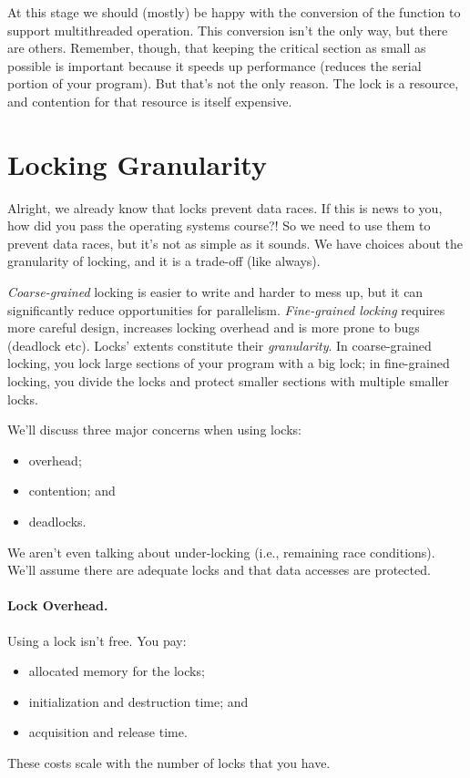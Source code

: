 \documentclass[a4paper]{report}
\begin{document}
At this stage we should (mostly) be happy with the conversion of the function to support multithreaded operation. This conversion isn't the only way, but there are others. Remember, though, that keeping the critical section as small as possible is important because it speeds up performance (reduces the serial portion of your program). But that's not the only reason. The lock is a resource, and contention for that resource is itself expensive.

\section*{Locking Granularity}

Alright, we already know that locks prevent data races. If this is news to you, how did you pass the operating systems course?! So we need to use them to prevent data races, but it's not as simple as it sounds. We have choices about the granularity of locking, and it is a trade-off (like always).

\textit{Coarse-grained} locking is easier to write and harder to mess up, but it can significantly reduce opportunities for parallelism. \textit{
Fine-grained locking} requires more careful design,
increases locking overhead and is more prone to bugs (deadlock etc).  
Locks' extents constitute their {\it granularity}. In coarse-grained locking, you
lock large sections of your program with a big lock; in fine-grained
locking, you divide the locks and protect smaller sections with multiple smaller locks.

We'll discuss three major concerns when using locks:
  \begin{itemize}
    \item overhead;
    \item contention; and
    \item deadlocks.
  \end{itemize}
We aren't even talking about under-locking (i.e., remaining race conditions). We'll assume there are adequate locks and that data accesses are protected. 

\paragraph{Lock Overhead.}
  Using a lock isn't free. You pay:
  \begin{itemize}
    \item allocated memory for the locks;
    \item initialization and destruction time; and
    \item acquisition and release time.
  \end{itemize}
  These costs scale with the number of locks that you have.
\end{document}
